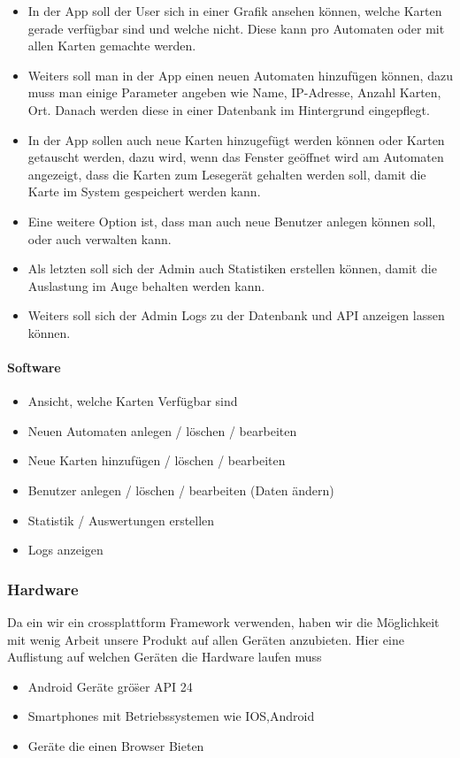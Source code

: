 \documentclass[a4paper]{article}
\begin{document}
\begin{itemize}
  \item In der App soll der User sich in einer Grafik ansehen können, welche Karten gerade verfügbar sind und welche nicht. Diese kann pro Automaten oder mit allen Karten gemachte werden. 
  \item Weiters soll man in der App einen neuen Automaten hinzufügen können, dazu muss man einige Parameter angeben wie Name, IP-Adresse, Anzahl Karten, Ort. Danach werden diese in einer Datenbank im Hintergrund eingepflegt. 
  \item In der App sollen auch neue Karten hinzugefügt werden können oder Karten getauscht werden, dazu wird, wenn das Fenster geöffnet wird am Automaten angezeigt, dass die Karten zum Lesegerät gehalten werden soll, damit die Karte im System gespeichert werden kann.
  \item Eine weitere Option ist, dass man auch neue Benutzer anlegen können soll, oder auch verwalten kann.
  \item Als letzten soll sich der Admin auch Statistiken erstellen können, damit die Auslastung im Auge behalten werden kann.
  \item Weiters soll sich der Admin Logs zu der Datenbank und API anzeigen lassen können.
\end{itemize}

\paragraph{Software}
\begin{itemize}
 \item Ansicht, welche Karten Verfügbar sind
 \item Neuen Automaten anlegen / löschen / bearbeiten 
 \item Neue Karten hinzufügen / löschen / bearbeiten
 \item Benutzer anlegen / löschen / bearbeiten (Daten ändern)
 \item Statistik / Auswertungen erstellen
 \item Logs anzeigen
\end{itemize}

\subsubsection{Hardware} \label{hardware}
Da ein wir ein crossplattform Framework verwenden, haben wir die M\"oglichkeit mit wenig Arbeit unsere Produkt auf allen Ger\"aten anzubieten. Hier eine Auflistung auf welchen Ger\"aten die Hardware laufen muss
\begin{itemize}
  \item Android Geräte grö\"ser API 24
  \item Smartphones mit Betriebssystemen wie IOS,Android
  \item Geräte die einen Browser Bieten
\end{itemize}
\end{document}
